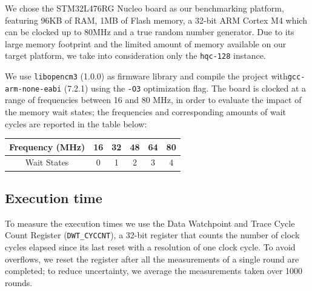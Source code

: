 We chose the STM32L476RG Nucleo board as our benchmarking platform, featuring 96KB of RAM, 1MB of Flash memory,
a 32-bit ARM Cortex M4 which can be clocked up to 80MHz and a true random number generator.
Due to its large memory footprint and the limited amount of memory available on our target platform,
we take into consideration only the \texttt{hqc-128} instance.

We use \texttt{libopencm3} (1.0.0) as firmware library and compile the project with\newline \texttt{gcc-arm-none-eabi} (7.2.1)
using the \texttt{-O3} optimization flag. The board is clocked at a range of frequencies between 16 and 80 MHz, in order to
evaluate the impact of the memory wait states; the frequencies and corresponding amounts of wait cycles are reported in
the table below:
\begin{table}[ht]
    \centering
    \label{tab:waitstates}
    \begin{tabular}{|c|c|c|c|c|c|}
        \hline
        Frequency (MHz) & 16 & 32 & 48 & 64 & 80 \\
        \hline 
        Wait States & 0 & 1 & 2 & 3 & 4  \\
        \hline    
    \end{tabular}
\end{table}

\subsection{Execution time}
To measure the execution times we use the Data Watchpoint and Trace Cycle Count Register (\texttt{DWT\_CYCCNT}),
a 32-bit register that counts the number of clock cycles elapsed since its last reset with a resolution
of one clock cycle. To avoid overflows, we reset the register after all the measurements of a single round
are completed; to reduce uncertainty, we average the measurements taken over 1000 rounds.

